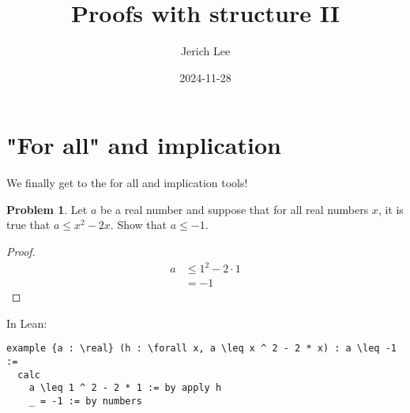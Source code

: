 \documentclass[12pt]{article}
\title{Proofs with structure II}
\author{Jerich Lee}
\date{2024-11-28}
\theoremstyle{definition} %
\newtheorem{problem}{Problem}
\theoremstyle{plain} %
\begin{document}
\maketitle
\section{"For all" and implication}
We finally get to the for all and implication tools!
\vspace{.5cm} 
\begin{problem}
    Let $a$ be a real number and suppose that for all real numbers $x$, it is true that $a\leq x^{2}-2x$. Show that $a\leq  -1$.   
\end{problem}
   \begin{proof}
    \begin{align}
        a&\leq 1^{2}-2\cdot 1 \\[10pt] 
        &= -1
    \end{align}
   \end{proof} 
   In Lean:
\begin{lstlisting}
example {a : \real} (h : \forall x, a \leq x ^ 2 - 2 * x) : a \leq -1 :=
  calc
    a \leq 1 ^ 2 - 2 * 1 := by apply h
    _ = -1 := by numbers
\end{lstlisting}
\end{document}
